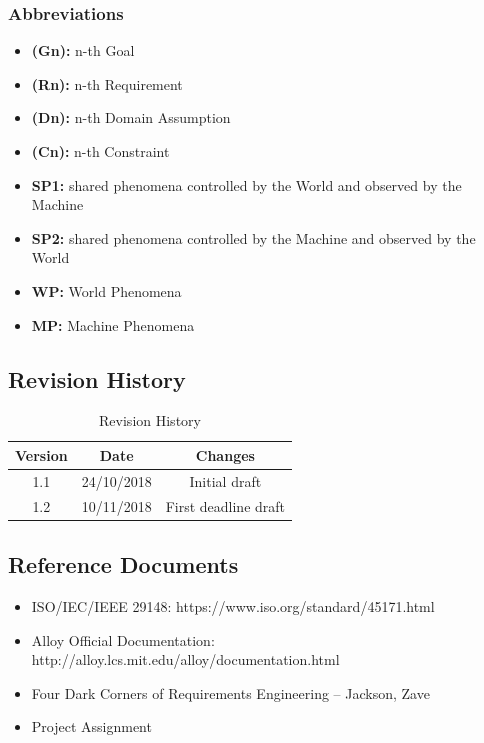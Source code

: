 \documentclass[titlepage]{article}
\begin{document}
				
		\subsubsection{Abbreviations}
			
			\begin{itemize}
				\item {\bf (Gn):} n-th Goal
				\item {\bf (Rn):} n-th Requirement
				\item {\bf (Dn):} n-th Domain Assumption
				\item {\bf (Cn):} n-th Constraint
				\item {\bf SP1:} shared phenomena controlled by the World and observed by the Machine
				\item {\bf SP2:} shared phenomena controlled by the Machine and observed by the World
				\item {\bf WP:} World Phenomena 
				\item {\bf MP:} Machine Phenomena
			\end{itemize}
			
	\subsection{Revision History}
	
	\begin{table}[ht]
		\centering
		\begin{tabular}{ccc} 
		Version & Date & Changes  \\ 
		\hline
		1.1 & 24/10/2018 & Initial draft \\
		1.2 & 10/11/2018 & First deadline draft \\
		\end{tabular}
		\caption{Revision History}
		\label{default}
	\end{table}
	
	\subsection{Reference Documents}
		
		\begin{itemize}
   			\item ISO/IEC/IEEE 29148: https://www.iso.org/standard/45171.html

   			 \item Alloy Official Documentation: http://alloy.lcs.mit.edu/alloy/documentation.html
   			 \item Four Dark Corners of Requirements Engineering – Jackson, Zave
			 \item Project Assignment
			\end{itemize}
\end{document}
